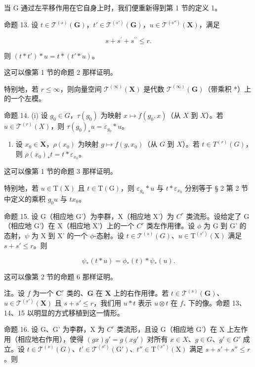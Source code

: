 当 G 通过左平移作用在它自身上时，我们便重新得到第 1 节的定义 1。

命题 13. 设 \(t \in \mathcal{T}^{(s)}(\mathbf{G})\)，\(t' \in \mathcal{T}^{(s')}(\mathbf{G})\)，\(u \in \mathcal{T}^{(s'')}(\mathbf{X})\)，满足

\[
s + s ^ {\prime} + s ^ {\prime \prime} \leqslant r.
\]

则 \((t*t')*u=t*(t'*u)\)。

这可以像第 1 节的命题 2 那样证明。

特别地，若 \(r \leqslant \infty\)，则向量空间 \(\mathcal{T}^{(\infty)}(\mathbf{X})\) 是代数 \(\mathcal{T}^{(\infty)}(\mathbf{G})\)（带乘积 \(*\)）上的一个左模。

命题 14. (i) 设 \(g_0 \in G\)，\(\tau(g_0)\) 为映射 \(x \mapsto f(g_0, x)\)（从 \(X\) 到 \(X\)）。若 \(u \in \mathcal{T}^{(r)}(X)\)，则 \(\tau(g_0)_*u = \varepsilon_{g_0} * u\)。

\begin{enumerate}
\def\labelenumi{(\roman{enumi})}
\setcounter{enumi}{1}
\tightlist
\item
  设 \(x_0 \in \mathbf{X}\)，\(\rho(x_0)\) 为映射 \(g \mapsto f(g, x_0)\)（从 \(G\) 到 \(X\)）。若 \(t \in T^{(r)}(G)\)，则 \(\rho(x_0)_*t = t * \varepsilon_{x_0}\)。
\end{enumerate}

这可以像第 1 节的命题 3 那样证明。

特别地，若 \(u \in \mathrm{T}(\mathrm{X})\) 且 \(t \in \mathrm{T}(\mathrm{G})\)，则 \(\varepsilon_{g_0} * u\) 与 \(t * \varepsilon_{x_0}\) 分别等于 § 2 第 2 节中定义的乘积 \(g_0u\) 与 \(tx_0\)。

命题 15. 设 G（相应地 G'）为李群，X（相应地 X'）为 \(C^{r}\) 类流形。设给定了 G（相应地 G'）在 X（相应地 X'）上的一个 \(C^{r}\) 类左作用律。设 \(\phi\) 为 G 到 G' 的态射，\(\psi\) 为 X 到 X' 的一个 \(\phi\)-态射。设 \(t \in \mathcal{T}^{(s)}(G)\)、\(u \in \mathrm{T}^{(s')}(\mathrm{X})\) 满足 \(s + s' \leqslant r\)。则

\[
\psi_ {*} (t * u) = \phi_ {*} (t) * \psi_ {*} (u).
\]

这可以像第 2 节的命题 6 那样证明。

注。设 \(f\) 为一个 \(\mathbf{C}^r\) 类的、\(\mathbf{G}\) 在 \(\mathbf{X}\) 上的右作用律。若 \(t \in \mathcal{T}^{(s)}(\mathbf{G})\)、\(u \in \mathcal{T}^{(s')}(\mathbf{X})\) 且 \(s + s' \leqslant r\)，我们用 \(u * t\) 表示 \(u \otimes t\) 在 \(f_*\) 下的像。命题 13、14、15 以明显的方式移植到这一情形。

命题 16. 设 G、G' 为李群，X 为 \(C^{r}\) 类流形，且设 G（相应地 G'）在 X 上左作用（相应地右作用），使得 \((gx)g' = g(xg')\) 对所有 \(x \in X\)、\(g \in G\)、\(g' \in G'\) 成立。设 \(t \in \mathcal{T}^{(s)}(G)\)、\(t' \in \mathcal{T}^{(s')}(\mathrm{G}')\)、\(t'' \in \mathrm{T}^{(s'')}(\mathrm{X})\) 满足 \(s + s' + s'' \leqslant r\)。则

